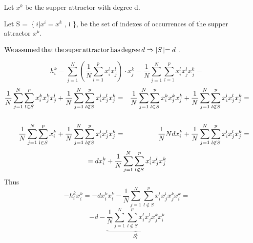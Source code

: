 Let $x^k_{}$ be the supper attractor with degree d.

Let S = $\left\{ i \left|  \right. \right. x^i_{} = x^k$ , i {}\}, be the set of indexes of occurrences of the
supper attractor $x^k_{}$.

$\operatorname{We} \operatorname{assumed} \operatorname{that} \operatorname{the} \operatorname{super} \operatorname{attractor}
\operatorname{has} \operatorname{degree} d    \Rightarrow \left| S
\left| = d  \right. \right.$.


\[ h_i^k = \sum^N_{j = 1} \left(^{} \frac{1}{N} \sum^p_{l = 1} x^l_{i^{}}
   x^l_j \right)_{} \cdot x_j^k = \frac{1}{N}  \sum^N_{j = 1} \sum^p_{l = 1}
   x^l_{i^{}} x^l_j x^k_{^{} j} = \]
\begin{eqnarray*}
  \frac{1}{N}  \sum^N_{j = 1} \sum_{l \in S}^p x^k_{i} x^k_j x^l_{j}   + \frac{1}{N}  \sum^N_{j = 1} \sum^p_{l \not\in S}
  x^l_{i} x^l_j x^k_{j}  & = &  \frac{1}{N}  \sum^N_{j = 1} \sum_{l
  \in S}^p x^k_{i} x^k_j x^k_{j}   + \frac{1}{N}
  \sum^N_{j = 1} \sum^p_{l \not\in S} x^l_{i} x^l_j x^k_{j} =\\
  &  & \\
  \frac{1}{N}  \sum^N_{j = 1} \sum_{l \in S}^p x^k_{i}  + 
  \frac{1}{N}  \sum^N_{j = 1} \sum^p_{l \not\in S} x^l_{i} x^l_j x^k_{j}
  & = &  \frac{1}{N} N d x^k_{i}  + \frac{1}{N}  \sum^N_{j =
  1} \sum^p_{l \not\in S} x^l_{i} x^l_j x^k_{j} =
\end{eqnarray*}
\[ = d x^k_{i^{}}  + \frac{1}{N}  \sum^N_{j = 1} \sum^p_{l \not\in S}
   x^l_{i^{}} x^l_j x^k_{^{} j} \]
Thus
\[ - h^k_i x^k_i = - d x_i^k x_i^k - \frac{1}{N}  \sum^N_{j = 1} \sum^p_{l
   \nin S} x^l_{i^{}} x^l_j x^k_{^{} j} x^k_{i^{}} = \]
\[ - d - \underbrace{ \frac{1}{N}  \sum^N_{j = 1} \sum^p_{l \nin S} x^l_{i^{}}
   x^l_j x^k_{^{} j} x^k_{i^{}} }_{S^k_i} \]
\ \ \ \ \ \ \ \ \ \ \ \ \ \ \ \ \ \ \ \ \ \ \ \ \ \ \ \ \ \ \ \ \ \ \ \ \ \ \
\ \ \ \ \ \ \ \ \ \ \ \ \ \ \ \ \ \ \ \ \ \ \

